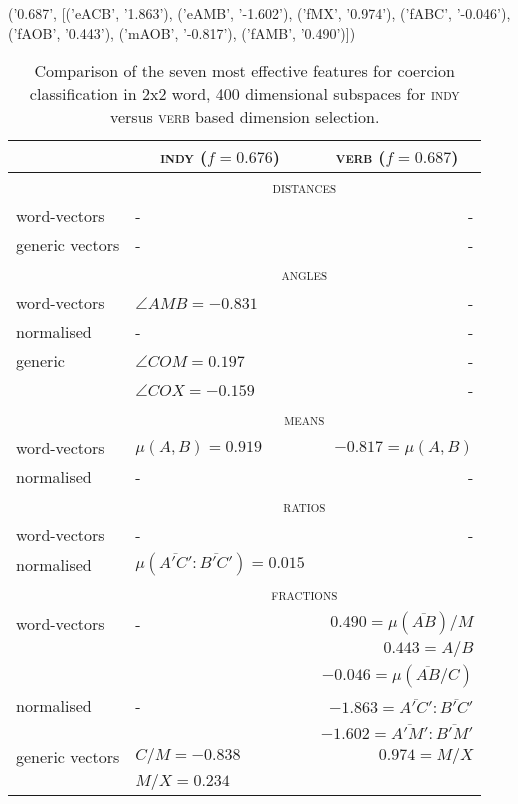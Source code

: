 
('0.687', [('eACB', '1.863'), ('eAMB', '-1.602'), ('fMX', '0.974'), ('fABC', '-0.046'), ('fAOB', '0.443'), ('mAOB', '-0.817'), ('fAMB', '0.490')])

\begin{table}
\centering
\begin{tabular}{llr}
\hline
& \multicolumn{1}{c}{\textsc{indy} ($f = 0.676$)} & \multicolumn{1}{c}{\textsc{verb} ($f = 0.687$)} \\
\hline
& \multicolumn{2}{c}{\textsc{distances}} \\
word-vectors & - & - \\
generic vectors & - & - \\
\hline
& \multicolumn{2}{c}{\textsc{angles}} \\
word-vectors & $\angle AMB = -0.831$ & - \\
normalised & - & - \\
generic & $\angle COM = 0.197$ & - \\
& $\angle COX = -0.159$ & - \\
\hline
& \multicolumn{2}{c}{\textsc{means}} \\
word-vectors & $\mu(A,B) = 0.919$ & $-0.817 = \mu(A,B)$ \\
normalised & - & - \\
\hline
& \multicolumn{2}{c}{\textsc{ratios}} \\
word-vectors & - & - \\
normalised & $\mu(\overline{A'C'}:\overline{B'C'}) = 0.015$ \\
\hline
& \multicolumn{2}{c}{\textsc{fractions}} \\
word-vectors & - & $0.490 = \mu(\overline{AB})/M$ \\
& & $0.443 = A/B$ \\
& & $-0.046 = \mu(\overline{AB}/C)$ \\
normalised & - & $-1.863 = \overline{A'C'}:\overline{B'C'}$ \\
& & $-1.602 = \overline{A'M'}:\overline{B'M'}$ \\
generic vectors & $C/M = -0.838$ & $0.974 = M/X$ \\
& $M/X = 0.234$ \\
\hline
\end{tabular}
\caption{Comparison of the seven most effective features for coercion classification in 2x2 word, 400 dimensional subspaces for \textsc{indy} versus \textsc{verb} based dimension selection.}
\label{tab:features}
\end{table}

